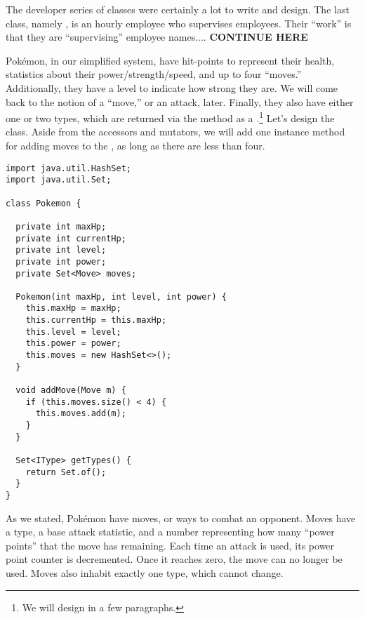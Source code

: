 The developer series of classes were certainly a lot to write and design. The last class, namely , is an hourly employee who supervises employees. Their ``work'' is that they are ``supervising'' employee names.... \textbf{CONTINUE HERE}


Pok\'emon, in our simplified system, have hit-points to represent their health, statistics about their power/strength/speed, and up to four ``moves.'' Additionally, they have a level to indicate how strong they are. We will come back to the notion of a ``move,'' or an attack, later. Finally, they also have either one or two types, which are returned via the  method as a .\footnote{We will design  in a few paragraphs.} Let's design the  class. Aside from the accessors and mutators, we will add one instance method for adding moves to the , as long as there are less than four. 

\begin{lstlisting}[language=MyJava]
import java.util.HashSet;
import java.util.Set; 

class Pokemon {
  
  private int maxHp;
  private int currentHp;
  private int level;
  private int power;
  private Set<Move> moves;

  Pokemon(int maxHp, int level, int power) {
    this.maxHp = maxHp;
    this.currentHp = this.maxHp;
    this.level = level;
    this.power = power;
    this.moves = new HashSet<>();
  }

  void addMove(Move m) { 
    if (this.moves.size() < 4) {
      this.moves.add(m);
    }
  }

  Set<IType> getTypes() {
    return Set.of();
  }
}
\end{lstlisting}

As we stated, Pok\'emon have moves, or ways to combat an opponent. Moves have a type, a base attack statistic, and a number representing how many ``power points'' that the move has remaining. Each time an attack is used, its power point counter is decremented. Once it reaches zero, the move can no longer be used. Moves also inhabit exactly one type, which cannot change.

